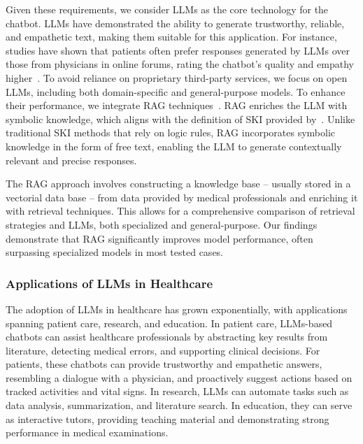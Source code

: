 %
Given these requirements, we consider \glspl{LLM} as the core technology for the chatbot.
%
\Glspl{LLM} have demonstrated the ability to generate trustworthy, reliable, and empathetic text, making them suitable for this application.
%
For instance, studies have shown that patients often prefer responses generated by \glspl{LLM} over those from physicians in online forums, rating the chatbot's quality and empathy higher~\cite{Chatbot-JAMAIntMed2023}.
%
To avoid reliance on proprietary third-party services, we focus on open \glspl{LLM}, including both domain-specific and general-purpose models.
%
To enhance their performance, we integrate \gls{RAG} techniques~\cite{Lewis-NIPS20}.
%
\Gls{RAG} enriches the \gls{LLM} with symbolic knowledge, which aligns with the definition of \gls{SKI} provided by~\cite{DBLP:journals/csur/CiattoSAMO24}.
%
Unlike traditional \gls{SKI} methods that rely on logic rules, \gls{RAG} incorporates symbolic knowledge in the form of free text, enabling the \gls{LLM} to generate contextually relevant and precise responses.

%
The \gls{RAG} approach involves constructing a knowledge base -- usually stored in a vectorial data base -- from data provided by medical professionals and enriching it with retrieval techniques.
%
This allows for a comprehensive comparison of retrieval strategies and \glspl{LLM}, both specialized and general-purpose.
%
Our findings demonstrate that \gls{RAG} significantly improves model performance, often surpassing specialized models in most tested cases.

%
\subsubsection{Applications of \Glspl{LLM} in Healthcare}
%
The adoption of \glspl{LLM} in healthcare has grown exponentially, with applications spanning patient care, research, and education.
%
In patient care, \glspl{LLM}-based chatbots can assist healthcare professionals by abstracting key results from literature, detecting medical errors, and supporting clinical decisions.
%
For patients, these chatbots can provide trustworthy and empathetic answers, resembling a dialogue with a physician, and proactively suggest actions based on tracked activities and vital signs.
%
In research, \glspl{LLM} can automate tasks such as data analysis, summarization, and literature search.
%
In education, they can serve as interactive tutors, providing teaching material and demonstrating strong performance in medical examinations.

